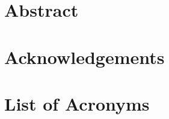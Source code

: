 \documentclass[12pt,twoside,a4paper,openright]{book}
\begin{document}

\renewcommand{\bibname}{References}
\renewcommand{\contentsname}{Table of Contents}

\newcommand{\TIL}{Troms{\o} IL\xspace}
\newcommand{\s}[1]{Section~\ref{#1}}
\newcommand{\f}[1]{Fig.~\ref{#1}}
\renewcommand{\t}[1]{Table~\ref{#1}}

\newcommand{\Section}[1]{%
 \section {#1}
 \label {sec:#1}
 \acresetall%
}

\newcommand{\Subsection}[1]{%
 \subsection {#1}
 \label {sec:#1}%
}
\newcommand{\PdfImage}[2]{%
 \begin{figure}
  \centering
  \texttt{[image: images]}
  \caption{#2}
  \label{pdf:#1}
 \end{figure}
} 

\newcommand{\PngImage}[3]{%
 \begin{figure}[H]
  \centering
  \texttt{[image: \#3]}
  \caption{#1}
  \label{png:#2}
 \end{figure}
} 

\pagestyle{empty}

\sloppy

\cleardoublepage
{}
\pagestyle{plain}

\chapter*{Abstract}



\chapter*{Acknowledgements}


%
\setcounter{secnumdepth}{3}
\setcounter{tocdepth}{3}
\tableofcontents	

\chapter*{List of Acronyms}
\begin{acronym}


\end{acronym}
\end{document}
